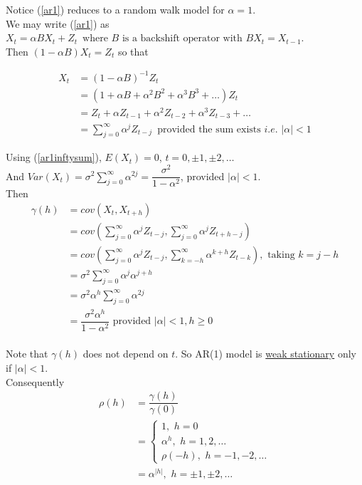 \documentclass[11pt, a4paper]{article}
\begin{document}
Notice (\ref{ar1}) reduces to a random walk model for $\alpha = 1$. \\

We may write (\ref{ar1}) as $X_t = \alpha BX_{t} + Z_t \,\,\, \text{where } B \text{ is a backshift operator with } BX_t = X_{t-1}$. \\

Then $(1 - \alpha B) X_t = Z_t$ so that

\begin{align}\label{ar1inftysum}
X_t &= (1 - \alpha B)^{-1} Z_t \nonumber \\
&= (1 + \alpha B + \alpha^2 B^2 + \alpha^3 B^3 + \ldots) Z_t \nonumber \\
&= Z_t + \alpha Z_{t-1} + \alpha^2 Z_{t-2} + \alpha^3 Z_{t-3} + \ldots \nonumber \\
&= \sum \limits_{j = 0}^{\infty} \alpha^j Z_{t-j} \,\,\, \text{provided the sum exists } i.e. \,\, |\alpha| < 1
\end{align}

Using (\ref{ar1inftysum}), $E(X_t) = 0$, $t = 0, \pm 1, \pm 2, \ldots$ \\

And $Var(X_t) = \sigma^2 \sum \limits_{j = 0}^{\infty} \alpha^{2j} = \dfrac{\sigma^2}{1 - \alpha^2}$, provided $|\alpha| < 1$. \\

Then
\begin{align*}
\gamma(h) &= cov(X_t, X_{t+h}) \\[0.25em]
&= cov\left(\sum \limits_{j = 0}^{\infty} \alpha^j Z_{t-j}, \sum \limits_{j = 0}^{\infty} \alpha^j Z_{t+h-j}\right) \\[0.25em]
&= cov \left(\sum \limits_{j = 0}^{\infty} \alpha^j Z_{t-j}, \sum \limits_{k = - h}^{\infty} \alpha^{k+h} Z_{t-k} \right), \,\, \text{taking } k = j - h \\[0.25em]
&= \sigma^2 \sum \limits_{j = 0}^{\infty} \alpha^j \alpha^{j+h} \\[0.25em]
&= \sigma^2 \alpha^h \sum \limits_{j = 0}^{\infty} \alpha^{2j} \\[0.25em]
&= \dfrac{\sigma^2 \alpha^h}{1 - \alpha^2} \text{ provided } |\alpha| < 1, h \geq 0
\end{align*}
\\
Note that $\gamma(h)$ does not depend on $t$. So AR(1) model is \underline{weak stationary} only if $|\alpha| < 1$. \\

Consequently
\begin{align*}
\rho(h) &= \dfrac{\gamma(h)}{\gamma(0)} \\[0.25em]
&= \begin{cases} 
1, \,\, h = 0 \\
\alpha^h, \,\, h = 1, 2, \ldots \\
\rho(-h), \,\, h = -1, -2, \ldots
\end{cases} \\[0.25em]
&= \alpha^{|h|}, \,\, h = \pm 1, \pm 2, \ldots
\end{align*}
\end{document}
